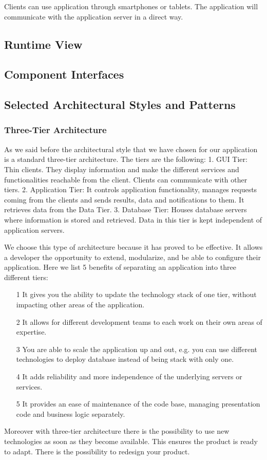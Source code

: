 \documentclass[12pt,titlepage]{article}
\begin{document}
Clients can use application through smartphones or tablets. The application will communicate with the application server in a direct way.

\subsection{Runtime View}
\subsection{Component Interfaces}
\subsection{Selected Architectural Styles and Patterns}
\subsubsection{Three-Tier Architecture} 
As we said before the architectural style that we have chosen for our application is a standard three-tier architecture. The tiers are the following:
1. GUI Tier: Thin clients. They display information and make the different services and functionalities reachable from the client. Clients can communicate with other tiers.
2. Application Tier: It controls application functionality, manages requests coming from the clients and sends results, data and notifications to them. It retrieves data from the Data Tier.
3. Database Tier: Houses database servers where information is stored and retrieved. Data in this tier is kept independent of application servers.

We choose this type of architecture because it has proved to be effective. It allows a developer the opportunity to extend, modularize, and be able to configure their application.
Here we list 5 benefits of separating an application into three different tiers:
\begin{itemize}
\item[1] It gives you the ability to update the technology stack of one tier, without impacting other areas of the application.
\item[2] It allows for different development teams to each work on their own areas of expertise.
\item[3] You are able to scale the application up and out, e.g. you can use different technologies to deploy database instead of being stack with only one.
\item[4] It adds reliability and more independence of the underlying servers or services.
\item[5] It provides an ease of maintenance of the code base, managing presentation code and business logic separately.
\end{itemize}
Moreover with three-tier architecture there is the possibility to use new technologies as soon as they become available. This ensures the product is ready to adapt. There is the possibility to redesign your product.
\end{document}
